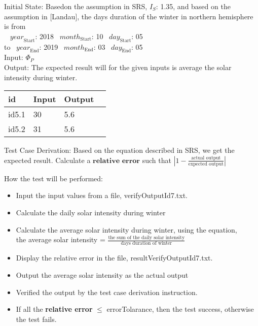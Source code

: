 \documentclass[12pt, titlepage]{article}
\begin{document}
\begin{enumerate}
Initial State:
Basedon the assumption in SRS\cite{YS2019}, $I_{S}$: 1.35, and based on the
assumption in [Landau]\cite{Charles2001}, the days duration of the winter in
northern hemisphere is from\\
~ $\mathit{year}_\text{Start}$: 2018
~$\mathit{month}_\text{Start}$: 10 
~$\mathit{day}_\text{Start}$: 05 \\
 to
~$\mathit{year}_\text{End}$: 2019 
~$\mathit{month}_\text{End}$: 03
~$\mathit{day}_\text{End}$: 05\\

Input: $\Phi_P$\\


Output: The expected result will for the given inputs is average the solar
intensity during winter.\\ 

\noindent \begin{tabular}{l l l l} 
    \toprule		
    \textbf{id} & \textbf{Input} & \textbf{Output}\\ 
	\midrule
   id5.1 & 30 & 5.6\\
   id5.2 & 31 & 5.6\\
    \bottomrule
  \end{tabular}



Test Case Derivation: Based on the equation described in SRS\cite{YS2019}, we get the expected result. Calculate a $\textbf{relative error}$ such that $| 1 - \frac{\text{actual output}}{ \text{expected
output}} |$  


How the test will be performed: 

\begin{itemize} 
\item Input the input values from a file, verifyOutputId7.txt. 
\item Calculate the daily solar intensity during winter 
\item Calculate the average solar intensity during winter, using the equation,\\the average solar intensity = $\frac{\text{the sum of the daily solar
intensity}}{\text{days duration of winter}}$
\item Display the relative error in the file, resultVerifyOutputId7.txt. 
\item Output the average solar intensity as the actual output
\item Verified the output by the test case derivation instruction. 
\item If all the \textbf{relative error}  $\leq$ errorTolarance, then the
test success, otherwise the test fails.
\end{itemize}
\end{enumerate}
\end{document}

